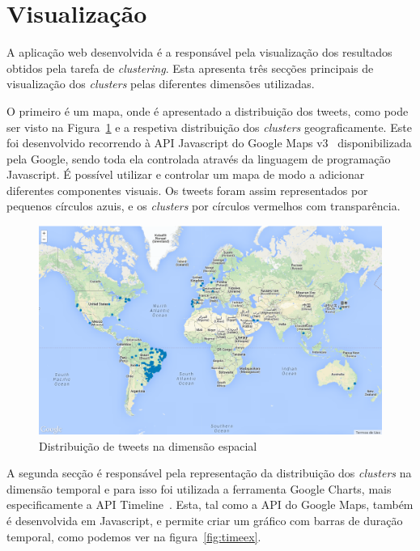 \section{Visualização} \label{sec:visu}

A aplicação web desenvolvida é a responsável pela visualização dos resultados obtidos pela tarefa de \textit{clustering}. Esta apresenta três secções principais de visualização dos \textit{clusters} pelas diferentes dimensões utilizadas. 

O primeiro é um mapa, onde é apresentado a distribuição dos tweets, como pode ser visto na Figura~\ref{fig:map1} e a respetiva distribuição dos \textit{clusters} geograficamente. Este foi desenvolvido recorrendo à API Javascript do Google Maps v3~\cite{googlemapsapi} disponibilizada pela Google, sendo toda ela controlada através da linguagem de programação Javascript. É possível utilizar e controlar um mapa de modo a adicionar diferentes componentes visuais. Os tweets foram assim representados por pequenos círculos azuis, e os \textit{clusters} por círculos vermelhos com transparência. 

\begin{figure}[h]
\centering
\includegraphics[width=1.0\linewidth]{./figures/olhopassarinho/map1.png}
\caption{Distribuição de tweets na dimensão espacial}
\label{fig:map1}
\end{figure}

A segunda secção é responsável pela representação da distribuição dos \textit{clusters} na dimensão temporal e para isso foi utilizada a ferramenta Google Charts, mais especificamente a API Timeline~\cite{googletimeline}. Esta, tal como a API do Google Maps, também é desenvolvida em Javascript, e permite criar um gráfico com barras de duração temporal, como podemos ver na figura~\ref{fig:timeex}. 

